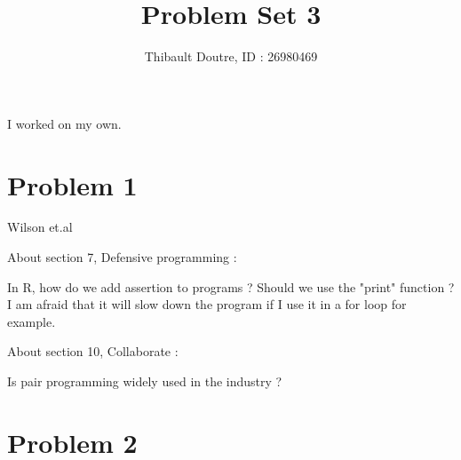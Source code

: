 \documentclass{llncs}\usepackage[]{graphicx}\usepackage[]{color}
\begin{document}
\title{Problem Set 3}
\author{Thibault Doutre, ID : 26980469}
\date{}
\maketitle
\bigbreak
\noindent
I worked on my own.

\section{Problem 1}
Wilson et.al

About section 7, Defensive programming :

In R, how do we add assertion to programs ? Should we use the "print" function ? I am afraid that it will slow down the program if I use it in a for loop for example. 

About section 10, Collaborate :

Is pair programming widely used in the industry ?

\section{Problem 2}
\end{document}
